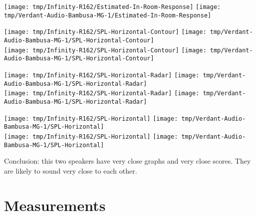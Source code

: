 \documentclass{tufte-book}
\begin{document}
\begin{figure*}[ht]
  \texttt{[image: tmp/Infinity-R162/Estimated-In-Room-Response]}
  \texttt{[image: tmp/Verdant-Audio-Bambusa-MG-1/Estimated-In-Room-Response]}
\end{figure*}

\begin{figure*}[ht]
  \texttt{[image: tmp/Infinity-R162/SPL-Horizontal-Contour]}
  \texttt{[image: tmp/Verdant-Audio-Bambusa-MG-1/SPL-Horizontal-Contour]}
  \\\vspace{\baselineskip}
  \texttt{[image: tmp/Infinity-R162/SPL-Horizontal-Contour]}
  \texttt{[image: tmp/Verdant-Audio-Bambusa-MG-1/SPL-Horizontal-Contour]}
\end{figure*}

\begin{figure*}[ht]
  \texttt{[image: tmp/Infinity-R162/SPL-Horizontal-Radar]}
  \texttt{[image: tmp/Verdant-Audio-Bambusa-MG-1/SPL-Horizontal-Radar]}
  \\\vspace{\baselineskip}
  \texttt{[image: tmp/Infinity-R162/SPL-Horizontal-Radar]}
  \texttt{[image: tmp/Verdant-Audio-Bambusa-MG-1/SPL-Horizontal-Radar]}
\end{figure*}

\begin{figure*}[ht]
  \texttt{[image: tmp/Infinity-R162/SPL-Horizontal]}
  \texttt{[image: tmp/Verdant-Audio-Bambusa-MG-1/SPL-Horizontal]}
  \\\vspace{\baselineskip}
  \texttt{[image: tmp/Infinity-R162/SPL-Horizontal]}
  \texttt{[image: tmp/Verdant-Audio-Bambusa-MG-1/SPL-Horizontal]}
\end{figure*}

Conclusion: this two speakers have very close graphs and very close scores. They are likely
to sound very close to each other.

\chapter{Measurements}

\begin{figure*}[p]
  \texttt{[image: \$\{speakers[speaker]['image']]}}
  \caption{${speakers[speaker]['title']}}
\end{figure*}
\end{document}
